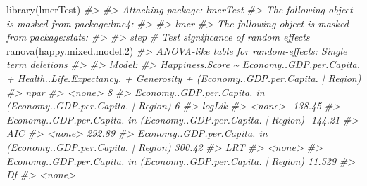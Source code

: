 \documentclass[
]{book}
\newenvironment{Shaded}{\begin{snugshade}}{\end{snugshade}}
\newcommand{\CommentTok}[1]{\textcolor[rgb]{0.56,0.35,0.01}{\textit{#1}}}
\newcommand{\FloatTok}[1]{\textcolor[rgb]{0.00,0.00,0.81}{#1}}
\newcommand{\FunctionTok}[1]{\textcolor[rgb]{0.00,0.00,0.00}{#1}}
\newcommand{\NormalTok}[1]{#1}
\theoremstyle{definition}
\theoremstyle{definition}
\theoremstyle{definition}
\theoremstyle{definition}
\theoremstyle{remark}
\begin{document}
\begin{Shaded}
\begin{Highlighting}[]
\FunctionTok{library}\NormalTok{(lmerTest)}
\CommentTok{\#\textgreater{} }
\CommentTok{\#\textgreater{} Attaching package: \textquotesingle{}lmerTest\textquotesingle{}}
\CommentTok{\#\textgreater{} The following object is masked from \textquotesingle{}package:lme4\textquotesingle{}:}
\CommentTok{\#\textgreater{} }
\CommentTok{\#\textgreater{}     lmer}
\CommentTok{\#\textgreater{} The following object is masked from \textquotesingle{}package:stats\textquotesingle{}:}
\CommentTok{\#\textgreater{} }
\CommentTok{\#\textgreater{}     step}
\CommentTok{\# Test significance of random effects}
\FunctionTok{ranova}\NormalTok{(happy.mixed.model}\FloatTok{.2}\NormalTok{)}
\CommentTok{\#\textgreater{} ANOVA{-}like table for random{-}effects: Single term deletions}
\CommentTok{\#\textgreater{} }
\CommentTok{\#\textgreater{} Model:}
\CommentTok{\#\textgreater{} Happiness.Score \textasciitilde{} Economy..GDP.per.Capita. + Health..Life.Expectancy. + Generosity + (Economy..GDP.per.Capita. | Region)}
\CommentTok{\#\textgreater{}                                                                 npar}
\CommentTok{\#\textgreater{} \textless{}none\textgreater{}                                                             8}
\CommentTok{\#\textgreater{} Economy..GDP.per.Capita. in (Economy..GDP.per.Capita. | Region)    6}
\CommentTok{\#\textgreater{}                                                                  logLik}
\CommentTok{\#\textgreater{} \textless{}none\textgreater{}                                                          {-}138.45}
\CommentTok{\#\textgreater{} Economy..GDP.per.Capita. in (Economy..GDP.per.Capita. | Region) {-}144.21}
\CommentTok{\#\textgreater{}                                                                    AIC}
\CommentTok{\#\textgreater{} \textless{}none\textgreater{}                                                          292.89}
\CommentTok{\#\textgreater{} Economy..GDP.per.Capita. in (Economy..GDP.per.Capita. | Region) 300.42}
\CommentTok{\#\textgreater{}                                                                    LRT}
\CommentTok{\#\textgreater{} \textless{}none\textgreater{}                                                                }
\CommentTok{\#\textgreater{} Economy..GDP.per.Capita. in (Economy..GDP.per.Capita. | Region) 11.529}
\CommentTok{\#\textgreater{}                                                                 Df}
\CommentTok{\#\textgreater{} \textless{}none\textgreater{}                                                            }

\end{Highlighting}
\end{Shaded}
\end{document}
